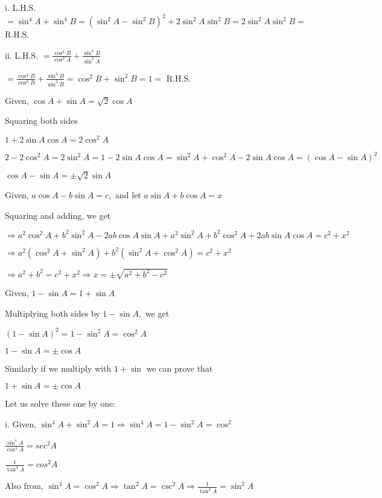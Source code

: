     i. L.H.S. $= \sin^4A + \sin^4B = (\sin^2A - \sin^2B)^2 + 2\sin^2A\sin^2B = 2\sin^2A\sin^2B =$ R.H.S.

    ii. L.H.S. $= \frac{\cos^4 B}{\cos^2 A} + \frac{\sin^4 B}{\sin^2 A}$

        $= \frac{\cos^4 B}{\cos^2 B} + \frac{\sin^4 B}{\sin^2 B} = \cos^2B + \sin^2B = 1 =$ R.H.S.

\item Given, $\cos A + \sin A = \sqrt{2}\cos A$

    Squaring both sides

    $1 + 2\sin A\cos A = 2\cos^2A$

    $2 - 2\cos^2A = 2\sin^2A = 1 - 2\sin A\cos A = \sin^2A + \cos^2A - 2\sin A\cos A = (\cos A - \sin A)^2$

    $\cos A - \sin A = \pm \sqrt{2}\sin A$

\item Given, $a\cos A - b\sin A = c,$ and let $a\sin A + b\cos A = x$

    Squaring and adding, we get

    $\Rightarrow a^2\cos^2A + b^2\sin^2A - 2ab\cos A\sin A + a^2\sin^2A + b^2\cos^2A + 2ab\sin A\cos A = c^2 + x^2$

    $\Rightarrow a^2(\cos^2A + \sin^2A) + b^2(\sin^2A + \cos^2A) = c^2 + x^2$

    $\Rightarrow a^2 + b^2 = c^2 + x^2 \Rightarrow x = \pm \sqrt{a^2 + b^2 - c^2}$

\item Given, $1 - \sin A = 1 + \sin A$

    Multiplying both sides by $1 - \sin A,$ we get

    $(1 - \sin A)^2 = 1 - \sin^2A = \cos^2A$

    $1 - \sin A = \pm \cos A$

    Similarly if we multiply with $1 + \sin$ we can prove that

    $1 + \sin A = \pm \cos A$

\item Let us solve these one by one:

    i. Given, $\sin^4A + \sin^2A = 1 \Rightarrow \sin^4A = 1 - \sin^2A = \cos^2$

       $\frac{\sin^4A}{\cos^4A} = sec^2A$

       $\frac{1}{\tan^4A} = cos^2A$

       Also from, $\sin^4A = \cos^2A \Rightarrow \tan^2A = \csc^2A \Rightarrow \frac{1}{\tan^2A} = \sin^2A$

